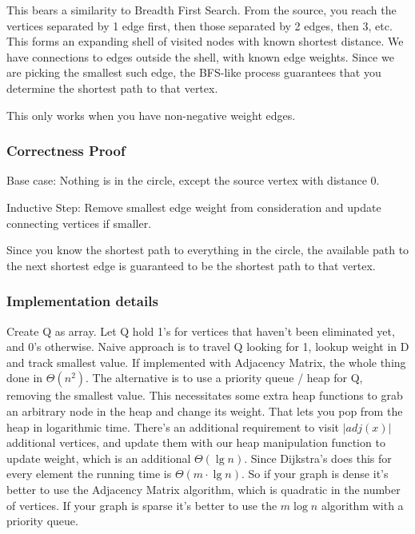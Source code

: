 \documentclass[english, 10pt]{article}
\begin{document}
This bears a similarity to Breadth First Search. From the source, you reach the
vertices separated by 1 edge first, then those separated by 2 edges, then 3,
etc.  This forms an expanding shell of visited nodes with known shortest
distance.  We have connections to edges outside the shell, with known edge
weights. Since we are picking the smallest such edge, the BFS-like process
guarantees that you determine the shortest path to that vertex.

This only works when you have non-negative weight edges.

\subsubsection{Correctness Proof}

Base case: Nothing is in the circle, except the source vertex with distance 0.

Inductive Step: Remove smallest edge weight from consideration and update
connecting vertices if smaller.

Since you know the shortest path to everything in the circle, the available
path to the next shortest edge is guaranteed to be the shortest path to that
vertex.

\subsubsection{Implementation details}
Create Q as array. Let Q hold 1's for vertices that haven't been eliminated
yet, and 0's otherwise. Naive approach is to travel Q looking for 1, lookup
weight in D and track smallest value. If implemented with Adjacency Matrix, the
whole thing done in $\Theta(n^2)$.
\newline
\newline
The alternative is to use a priority queue / heap for Q, removing the smallest
value. This necessitates some extra heap functions to grab an arbitrary node in
the heap and change its weight. That lets you pop from the heap in logarithmic
time. There's an additional requirement to visit $|adj(x)|$ additional vertices,
and update them with our heap manipulation function to update weight, which is
an additional $\Theta(\lg n)$. Since Dijkstra's does this for every element the
running time is $\Theta(m\cdot\lg n)$.
\newline
\newline
So if your graph is dense it's better to use the Adjacency Matrix algorithm,
which is quadratic in the number of vertices. If your graph is sparse it's
better to use the $m\log n$ algorithm with a priority queue.
\end{document}

